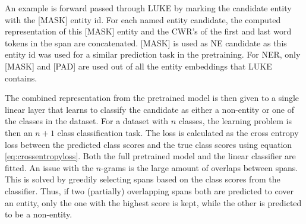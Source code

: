 \documentclass[main.tex]{subfiles}
\begin{document}
An example is forward passed through LUKE by marking the candidate entity with the [MASK] entity id.
For each named entity candidate, the computed representation of this [MASK] entity and the CWR's of the first and last word tokens in the span are concatenated.
[MASK] is used as NE candidate as this entity id was used for a similar prediction task in the pretraining.
For NER, only [MASK] and [PAD] are used out of all the entity embeddings that LUKE contains.

The combined representation from the pretrained model is then given to a single linear layer that learns to classify the candidate as either a non-entity or one of the classes in the dataset.
For a dataset with $ n $ classes, the learning problem is then an $ n+1 $ class classification task.
The loss is calculated as the cross entropy loss between the predicted class scores and the true class scores using equation \eqref{eq:crossentropyloss}.
Both the full pretrained model and the linear classifier are fitted.
An issue with the $ n $-grams is the large amount of overlaps between spans.
This is solved by greedily selecting spans based on the class scores from the classifier.
Thus, if two (partially) overlapping spans both are predicted to cover an entity, only the one with the highest score is kept, while the other is predicted to be a non-entity.

\end{document}

